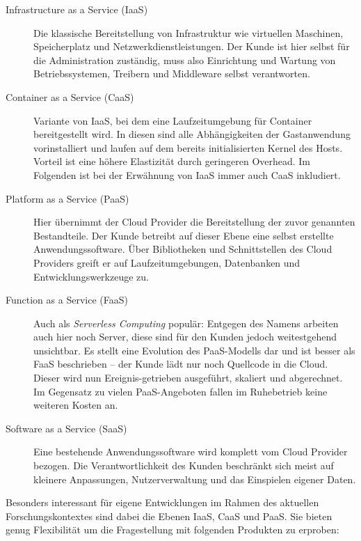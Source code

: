 \begin{description}
	
	\item[Infrastructure as a Service (IaaS)] Die klassische Bereitstellung von Infrastruktur wie virtuellen Maschinen, Speicherplatz und Netzwerkdienstleistungen. Der Kunde ist hier selbst für die Administration zuständig, muss also Einrichtung und Wartung von Betriebssystemen, Treibern und Middleware selbst verantworten.
	
	\item[Container as a Service (CaaS)] Variante von IaaS, bei dem eine Laufzeitumgebung für Container bereitgestellt wird. In diesen sind alle Abhängigkeiten der Gastanwendung vorinstalliert und laufen auf dem bereits initialisierten Kernel des Hosts. Vorteil ist eine höhere Elastizität durch geringeren Overhead. Im Folgenden ist bei der Erwähnung von IaaS immer auch CaaS inkludiert.
	
	\item[Platform as a Service (PaaS)] Hier übernimmt der Cloud Provider die Bereitstellung der zuvor genannten Bestandteile. Der Kunde betreibt auf dieser Ebene eine selbst erstellte Anwendungssoftware. Über Bibliotheken und Schnittstellen des Cloud Providers greift er auf Laufzeitumgebungen, Datenbanken und Entwicklungswerkzeuge zu.
	
	\item[Function as a Service (FaaS)] Auch als \emph{Serverless Computing} populär: Entgegen des Namens arbeiten auch hier noch Server, diese sind für den Kunden jedoch weitestgehend unsichtbar. Es stellt eine Evolution des PaaS-Modells dar und ist besser als FaaS beschrieben -- der Kunde lädt nur noch Quellcode in die Cloud. Dieser wird nun Ereignis-getrieben ausgeführt, skaliert und abgerechnet. Im Gegensatz zu vielen PaaS-Angeboten fallen im Ruhebetrieb keine weiteren Kosten an.
	
	\item[Software as a Service (SaaS)] Eine bestehende Anwendungssoftware wird komplett vom Cloud Provider bezogen. Die Verantwortlichkeit des Kunden beschränkt sich meist auf kleinere Anpassungen, Nutzerverwaltung und das Einspielen eigener Daten.
	
\end{description}

\noindent
Besonders interessant für eigene Entwicklungen im Rahmen des aktuellen Forschungskontextes sind dabei die Ebenen IaaS, CaaS und PaaS. Sie bieten genug Flexibilität um die Fragestellung mit folgenden Produkten zu erproben:

